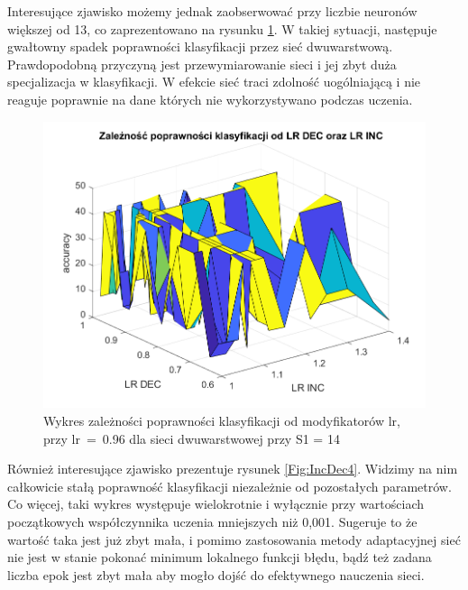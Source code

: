 \documentclass[12pt,twoside]{article}
\begin{document}
Interesujące zjawisko możemy jednak zaobserwować przy liczbie neuronów większej od 13, co zaprezentowano na rysunku \ref{Fig:IncDec3}.
W takiej sytuacji, następuje gwałtowny spadek poprawności klasyfikacji przez sieć dwuwarstwową.
Prawdopodobną przyczyną jest przewymiarowanie sieci i jej zbyt duża specjalizacja w klasyfikacji.
W efekcie sieć traci zdolność uogólniającą i nie reaguje poprawnie na dane których nie wykorzystywano podczas uczenia.

\begin{figure}[ht]
	\centering
	\includegraphics[width=16cm]{figures/IncDec_3.png}
	\caption{Wykres zależności poprawności klasyfikacji od modyfikatorów lr, przy lr~=~0.96 dla sieci dwuwarstwowej przy S1 = 14}
	\label{Fig:IncDec3}
\end{figure}


Również interesujące zjawisko prezentuje rysunek \ref{Fig:IncDec4}.
Widzimy na nim całkowicie stałą poprawność klasyfikacji niezależnie od pozostałych parametrów.
Co więcej, taki wykres występuje wielokrotnie i wyłącznie przy wartościach początkowych współczynnika uczenia mniejszych niż 0,001.
Sugeruje to że wartość taka jest już zbyt mała, i pomimo zastosowania  metody adaptacyjnej sieć nie jest w stanie pokonać minimum lokalnego funkcji błędu, bądź też zadana liczba epok jest zbyt mała aby mogło dojść do efektywnego nauczenia sieci.
\end{document}
